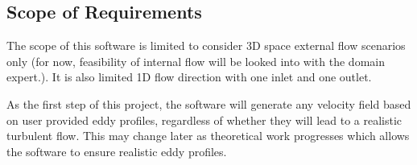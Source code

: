 \documentclass[12pt]{article}
\begin{document}

\subsection{Scope of Requirements} 

The scope of this software is limited to consider 3D space external flow scenarios only (for now, feasibility of internal flow will be looked into with the domain expert.). It is also limited 1D flow direction with one inlet and one outlet.

As the first step of this project, the software will generate any velocity field based on user provided eddy profiles, regardless of whether they will lead to a realistic turbulent flow. This may change later as theoretical work progresses which allows the software to ensure realistic eddy profiles.



\end{document}

